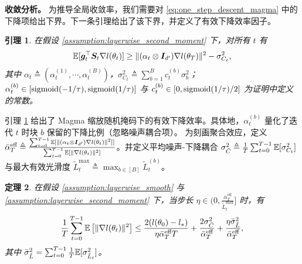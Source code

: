 \documentclass[11pt, a4paper, twocolumn, copyright, goog]{google}
\theoremstyle{plain}
\newtheorem{theorem}{定理}
\newtheorem{lemma}[theorem]{引理}
\theoremstyle{definition}
\theoremstyle{remark}
\begin{document}
\textbf{收敛分析。} 
为推导全局收敛率，我们需要对 \eqref{eq:one_step_descent_magma} 中的下降项给出下界。下一条引理给出了该下界，并定义了有效下降效率因子。

\begin{lemma} \label{sup_lem:descent_lower_bound}
    在假设 \ref{assumption:layerwise_second_moment} 下，对所有 $t$ 有
    \begin{equation} \label{eq:lb_descent}
        \mathbb{E} [{\bm{g}}_t^\top {\bm{S}}_t  \nabla l(\theta_t)] \geq \| (\alpha_t \otimes {\bm{I}}_{d'}) \nabla l (\theta_T) \|^2 - \sigma^2_{C_t},
    \end{equation}
    其中 $\alpha_t \triangleq (\alpha_t^{(1)}, \cdots, \alpha_t^{(B)})$，$\sigma^2_{C_t} \triangleq \sum_{b=1}^{B} c_t^{(b)}  \sigma^2_b$；$\alpha_t^{(b)} \in [\operatorname{sigmoid}(-1/\tau), \operatorname{sigmoid}(1/\tau)] $ 与 $c_t^{(b)} \in [0, \operatorname{sigmoid}(1/\tau) / 2]$ 为证明中定义的常数。
\end{lemma}


引理 \ref{sup_lem:descent_lower_bound} 给出了 Magma 缩放随机掩码下的有效下降效率。具体地，$\alpha_t^{(b)}$ 量化了迭代 $t$ 时块 $b$ 保留的下降比例（忽略噪声耦合项）。
为刻画聚合效应，定义 $\bar{\alpha}_{T}^{\textrm{eff}} \triangleq \frac{\sum_{t=0}^{T-1} \mathbb{E} [ \| (\alpha_t \otimes {\bm{I}}_{d'}) \nabla l (\theta_t) \|^2 ] ]}{\sum_{t=0}^{T-1} \mathbb{E} [ \| \nabla l(\theta_t) \|^2 ]}$。并定义平均噪声-下降耦合 $\sigma^2_{\bar{C}} \triangleq \frac{1}{T}\sum_{t=0}^{T-1}\mathbb{E}[\sigma^2_{C_t}]$ 与最大有效光滑度 $\tilde{L}_t^{\max} \triangleq \max_{b\in[B]} \tilde{L}_{t}^{(b)}$。




\begin{theorem} \label{theorem:main_result}
    在假设 \ref{assumption:layerwise_smooth} 与 \ref{assumption:layerwise_second_moment} 下，当步长 $\eta \in (0, \frac{\bar{\alpha}_{T}^{\textrm{eff}}}{ \tilde{L}_t^{\max} } ]$ 时，有 
    \begin{equation} \label{eq:magma:conv}
        \frac{1}{T} \sum_{t=0}^{T-1} \mathbb{E} \left[ \| \nabla l (\theta_t) \|^2 \right]
            \le \frac{2(l(\theta_0) - l_*) }{\eta \bar{\alpha}_{T}^{\textrm{eff}} T}
            +   \frac{2 \sigma^2_{\bar{C}}}{\bar{\alpha}_{T}^{\textrm{eff}}}  
            + \frac{\eta \bar{\sigma}^2_{\tilde{L}}}{ \bar{\alpha}_{T}^{\textrm{eff}}},
    \end{equation}
    其中 $ \bar{\sigma}^2_{\tilde{L}} = \sum_{t=0}^{T-1} \frac{1}{T} \mathbb{E} [\sigma^2_{\tilde{L}_t}]$。 
\end{theorem}
\end{document}

